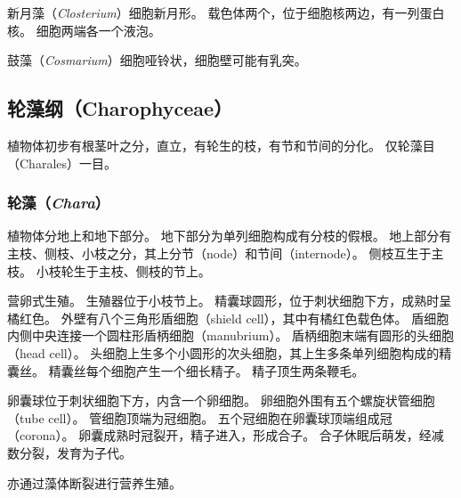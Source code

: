 \documentclass[11pt]{article}
\begin{document}
\par

新月藻（\textit{Closterium}）细胞新月形。
载色体两个，位于细胞核两边，有一列蛋白核。
细胞两端各一个液泡。

\par

鼓藻（\textit{Cosmarium}）细胞哑铃状，细胞壁可能有乳突。

\subsection{轮藻纲（Charophyceae）}
植物体初步有根茎叶之分，直立，有轮生的枝，有节和节间的分化。
仅轮藻目（Charales）一目。

\subsubsection{轮藻（\textit{Chara}）}
植物体分地上和地下部分。
地下部分为单列细胞构成有分枝的假根。
地上部分有主枝、侧枝、小枝之分，其上分节（node）和节间（internode）。
侧枝互生于主枝。
小枝轮生于主枝、侧枝的节上。

\par

营卵式生殖。
生殖器位于小枝节上。
精囊球圆形，位于刺状细胞下方，成熟时呈橘红色。
外壁有八个三角形盾细胞（shield cell），其中有橘红色载色体。
盾细胞内侧中央连接一个圆柱形盾柄细胞（manubrium）。
盾柄细胞末端有圆形的头细胞（head cell）。
头细胞上生多个小圆形的次头细胞，其上生多条单列细胞构成的精囊丝。
精囊丝每个细胞产生一个细长精子。
精子顶生两条鞭毛。

\par

卵囊球位于刺状细胞下方，内含一个卵细胞。
卵细胞外围有五个螺旋状管细胞（tube cell）。
管细胞顶端为冠细胞。
五个冠细胞在卵囊球顶端组成冠（corona）。
卵囊成熟时冠裂开，精子进入，形成合子。
合子休眠后萌发，经减数分裂，发育为子代。

\par

亦通过藻体断裂进行营养生殖。
\end{document}
